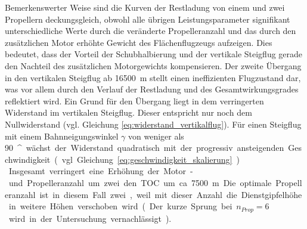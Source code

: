 Bemerkenswerter Weise sind die Kurven der Restladung von einem und zwei Propellern deckungsgleich, obwohl alle übrigen Leistungsparameter signifikant unterschiedliche Werte durch die veränderte Propelleranzahl und das durch den zusätzlichen Motor erhöhte Gewicht des Flächenflugzeugs aufzeigen. Dies bedeutet, dass der Vorteil der Schubhalbierung und der vertikale Steigflug gerade den Nachteil des zusätzlichen Motorgewichts kompensieren. Der zweite Übergang in den vertikalen Steigflug ab \SI{16500}{m} stellt einen ineffizienten Flugzustand dar, was vor allem durch den Verlauf der Restladung und des Gesamtwirkungsgrades reflektiert wird. Ein Grund für den Übergang liegt in dem verringerten Widerstand im vertikalen Steigflug. Dieser entspricht nur noch dem Nullwiderstand (vgl. Gleichung \eqref{eq:widerstand_vertikalflug}). Für einen Steigflug mit einem Bahnneigungswinkel \ensuremath{\gamma} von weniger als \SI{90}{^\circ} wächst der Widerstand quadratisch mit der progressiv ansteigenden Geschwindigkeit (vgl. Gleichung \eqref{eq:geschwindigkeit_skalierung}).\\
Insgesamt verringert eine Erhöhung der Motor- und Propelleranzahl um zwei den TOC um ca. \SI{7500}{m}. Die optimale Propelleranzahl ist in diesem Fall zwei, weil mit dieser Anzahl die Dienstgipfelhöhe in weitere Höhen verschoben wird.
(Der kurze Sprung bei \ensuremath{n_{Prop} = 6} wird in der Untersuchung vernachlässigt).

